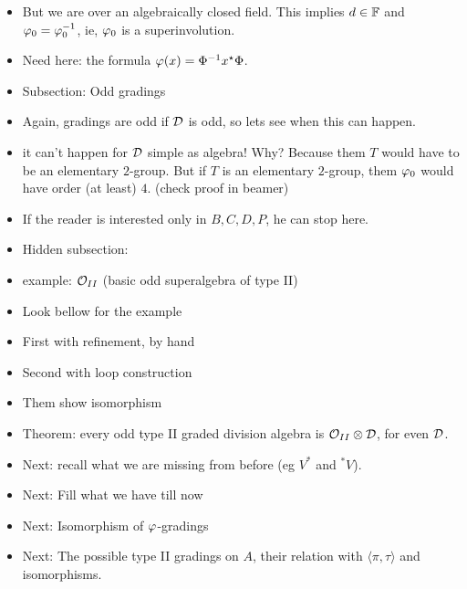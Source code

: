 \documentclass{amsbook}
\begin{document}
\begin{itemize}
        \item But we are over an algebraically closed field. This implies $d \in \mathbb{F}$ and $\varphi_0 = \varphi_0^{-1}$, ie, $\varphi_0$ is a superinvolution.
        
        \item Need here: the formula $\varphi(x) = \Phi^{-1} x^\star \Phi$.
        
        \item Subsection: Odd gradings
        
        \item Again, gradings are odd if $\mathcal{D}$ is odd, so lets see when this can happen.
        
        \item it can't happen for $\mathcal{D}$ simple as algebra! Why? Because them $T$ would have to be an elementary $2$-group. But if $T$ is an elementary $2$-group, them $\varphi_0$ would have order (at least) $4$. (check proof in beamer)
        
        \item If the reader is interested only in $B, C, D, P$, he can stop here.
        
        \item Hidden subsection:
        
        \item example: $\mathcal O_{II}$ (basic odd superalgebra of type II)
        
        \item Look bellow for the example
        
        \item First with refinement, by hand
        
        \item Second with loop construction
        
        \item Them show isomorphism
        
        \item Theorem: every odd type II graded division algebra is $\mathcal O_{II} \otimes \mathcal{D}$, for even $\mathcal{D}$.
        
        \item Next: recall what we are missing from before (eg $V^*$ and $^* V$).
        
        \item Next: Fill what we have till now
        
        \item Next: Isomorphism of $\varphi$-gradings
        
        \item Next: The possible type II gradings on $A$, their relation with $\langle \pi, \tau\rangle$ and isomorphisms.
        
    \end{itemize}
\end{document}
